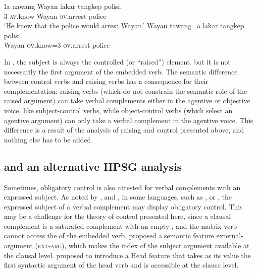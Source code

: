 \ex
\label{ov}
\gll Ia nawang           Wayan lakar  tangkep            polisi.\\
     3  \textsc{av}.know Wayan \FUT{} \textsc{ov}.arrest police\\
\glt `He knew that the police would arrest Wayan.'
\ex
\label{rais-ov}
\gll Wayan tawang=a           lakar  tangkep            polisi. \\
     Wayan \textsc{ov}.know=3 \FUT{} \textsc{ov}.arrest police\\ 
\zl


In , the subject is always the controlled (or ``raised'') element, but it is not
necessarily the first argument of the embedded verb. The semantic difference between control verbs
and raising verbs has a consequence for their complementation: raising verbs (which do not constrain
the semantic role of the raised argument) can take verbal complements either in the agentive or
objective voice, like subject-control verbs, while object-control verbs (which select an agentive argument) can only take a
verbal complement in the agentive voice. This difference is a result of the analysis of raising and
control presented above, and nothing else has to be added.



\subsection{\xarg and an alternative HPSG analysis}\label{section-xarg}

Sometimes, obligatory control is also attested for verbal complements with an expressed subject.  As
noted by \citet{Zec87a-u}, \citet{Farkas1988} and \citet[--116]{GH2001a-u}, in some languages, such
as ,  \citep{Kuno76a-u,Iida96a-u} or  \citep{Karimi2008},
the expressed subject of a verbal complement may display obligatory control. This may be a challenge
for the theory of control presented here, since a clausal complement is a saturated complement with
an empty \subjl, and the matrix verb cannot access the \subjv of the embedded verb. \citet[]{SP91a-u} proposed a semantic feature external-argument (\textsc{ext-arg}), which makes the index of the
subject argument available at the clausal level.  \citet[409]{Sag2007a} proposed to introduce a Head
feature \xarg that takes as its value the first syntactic argument of the head verb and is
accessible at the clause level.

